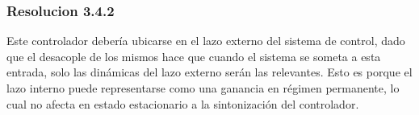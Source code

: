 \documentclass[
  11pt,
  letterpaper,
   addpoints,
   answers
  ]{exam}
\begin{document}
\begin{questions}
\begin{solution}
\subsubsection*{Resolucion 3.4.2}
Este controlador debería ubicarse en el lazo externo del sistema de control, dado que el desacople de los mismos hace que cuando el sistema se someta a esta entrada, solo
las dinámicas del lazo externo serán las relevantes. Esto es porque el lazo interno puede representarse como una ganancia en régimen permanente, lo cual no afecta en estado estacionario a la sintonización del controlador.
\end{solution}
\end{questions}
\newpage
\end{document}
